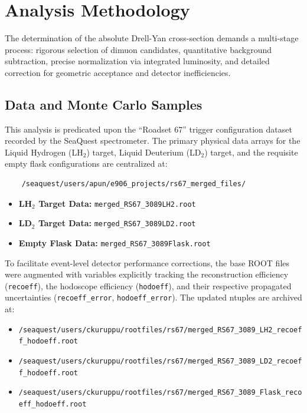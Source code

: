 \documentclass[11pt]{article}
\begin{document}
\section{Analysis Methodology}
\label{sec:methodology}
The determination of the absolute Drell-Yan cross-section demands a multi-stage process: rigorous selection of dimuon candidates, quantitative background subtraction, precise normalization via integrated luminosity, and detailed correction for geometric acceptance and detector inefficiencies.

\subsection{Data and Monte Carlo Samples}
This analysis is predicated upon the ``Roadset 67'' trigger configuration dataset recorded by the SeaQuest spectrometer. The primary physical data arrays for the Liquid Hydrogen (LH$_2$) target, Liquid Deuterium (LD$_2$) target, and the requisite empty flask configurations are centralized at:
\begin{verbatim}
    /seaquest/users/apun/e906_projects/rs67_merged_files/
\end{verbatim}
\begin{itemize}
    \item \textbf{LH$_2$ Target Data:} \texttt{merged\_RS67\_3089LH2.root}
    \item \textbf{LD$_2$ Target Data:} \texttt{merged\_RS67\_3089LD2.root}
    \item \textbf{Empty Flask Data:} \texttt{merged\_RS67\_3089Flask.root}
\end{itemize}

To facilitate event-level detector performance corrections, the base ROOT files were augmented with variables explicitly tracking the reconstruction efficiency (\texttt{recoeff}), the hodoscope efficiency (\texttt{hodoeff}), and their respective propagated uncertainties (\texttt{recoeff\_error}, \texttt{hodoeff\_error}). The updated ntuples are archived at:
\begin{itemize}
    \item \texttt{/seaquest/users/ckuruppu/rootfiles/rs67/merged\_RS67\_3089\_LH2\_recoeff\_hodoeff.root}
    \item \texttt{/seaquest/users/ckuruppu/rootfiles/rs67/merged\_RS67\_3089\_LD2\_recoeff\_hodoeff.root}
    \item \texttt{/seaquest/users/ckuruppu/rootfiles/rs67/merged\_RS67\_3089\_Flask\_recoeff\_hodoeff.root}
\end{itemize}
\end{document}
